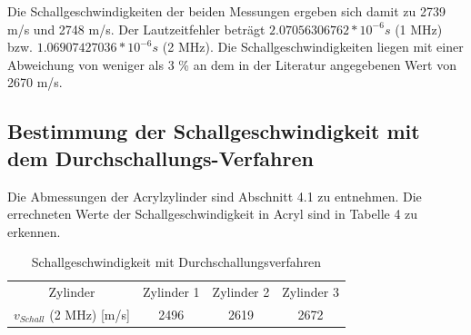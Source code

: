 \documentclass[11pt,ngerman,a4paper]{article}
\begin{document}
Die Schallgeschwindigkeiten der beiden Messungen ergeben sich damit zu 2739 m/s und 2748 m/s. Der Lautzeitfehler beträgt $2.07056306762*10^{-6} s$ (1 MHz) bzw. $1.06907427036*10^{-6} s$ (2 MHz).
Die Schallgeschwindigkeiten liegen mit einer Abweichung von weniger als 3 \%  an dem in der Literatur angegebenen Wert von 2670 m/s.
\subsection{Bestimmung der Schallgeschwindigkeit mit dem Durchschallungs-Verfahren}

Die Abmessungen der Acrylzylinder sind Abschnitt 4.1 zu entnehmen. Die errechneten Werte der Schallgeschwindigkeit in Acryl sind in Tabelle 4 zu erkennen.
\begin{table}[h]
\centering
 \begin{tabular}{|c||c|c|c|}
 Zylinder & Zylinder 1 & Zylinder 2 & Zylinder 3 \\
 $v_{Schall}$ (2 MHz) [m/s] & 2496 & 2619 & 2672 \\
 \end{tabular}
\caption{Schallgeschwindigkeit mit Durchschallungsverfahren}
\end{table}
\end{document}
